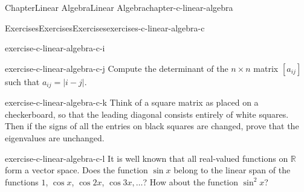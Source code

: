 \documentclass[oneside,10pt,]{book}
\numberwithin{equation}{section}
\begin{document}
\begin{chapterptx}{Chapter}{Linear Algebra}{}{Linear Algebra}{}{}{chapter-c-linear-algebra}
\begin{exercises-section}{Exercises}{Exercises}{}{Exercises}{}{}{exercises-c-linear-algebra-c}
\begin{divisionexercise}{8}{}{}{exercise-c-linear-algebra-c-i}
\end{divisionexercise}%
\begin{divisionexercise}{9}{}{}{exercise-c-linear-algebra-c-j}%
Compute the determinant of the \(n \times  n\) matrix \(\left[a_{i j}\right]\) such that \(a_{i j} =\lvert i-j\rvert\).%
\end{divisionexercise}%
\begin{divisionexercise}{10}{}{}{exercise-c-linear-algebra-c-k}%
Think of a square matrix as placed on a checkerboard, so that the leading diagonal consists entirely of white squares. Then if the signs of all the entries on black squares are changed, prove that the eigenvalues are unchanged.%
\end{divisionexercise}%
\begin{divisionexercise}{11}{}{}{exercise-c-linear-algebra-c-l}%
It is well known that all real-valued functions on \(\mathbb{R}\) form a vector space. Does the function \(\sin  x\) belong to the linear span of the functions \(1\), \(\cos x\), \(\cos 2 x\), \(\cos 3 x,\ldots\)?    How about the function \(\sin^2 x\)?%
\end{divisionexercise}%
\end{exercises-section}
\end{chapterptx}
%
%
\typeout{************************************************}
\typeout{************************************************}
%
\end{document}
